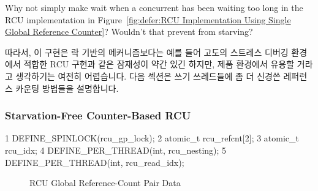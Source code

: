 	Why not simply make  wait when a concurrent
	 has been waiting too long in
	the RCU implementation in
	Figure~\ref{fig:defer:RCU Implementation Using Single Global Reference Counter}?
	Wouldn't that prevent  from starving?
	\fi
{} \QuickQuizEnd

따라서, 이 구현은 락 기반의 메커니즘보다는 예를 들어 고도의 스트레스 디버깅
환경에서 적합한 RCU 구현과 같은 잠재성이 약간 있긴 하지만, 제품 환경에서 유용할
거라고 생각하기는 여전히 어렵습니다.
다음 섹션은 쓰기 쓰레드들에 좀 더 신경쓴 레퍼런스 카운팅 방법들을 설명합니다.
\iffalse

Therefore, it is still hard to imagine this implementation being useful
in a production setting, though it has a bit more potential
than the lock-based mechanism, for example, as an RCU implementation
suitable for a high-stress debugging environment.
The next section describes a variation on the reference-counting
scheme that is more favorable to writers.
\fi

\subsubsection{Starvation-Free Counter-Based RCU}
\label{defer:Starvation-Free Counter-Based RCU}

{ \scriptsize
\begin{verbbox}
  1 DEFINE_SPINLOCK(rcu_gp_lock);
  2 atomic_t rcu_refcnt[2];
  3 atomic_t rcu_idx;
  4 DEFINE_PER_THREAD(int, rcu_nesting);
  5 DEFINE_PER_THREAD(int, rcu_read_idx);
\end{verbbox}
}
\begin{figure}[tbp]
\centering
\theverbbox
\caption{RCU Global Reference-Count Pair Data}
\label{fig:defer:RCU Global Reference-Count Pair Data}
\end{figure}

